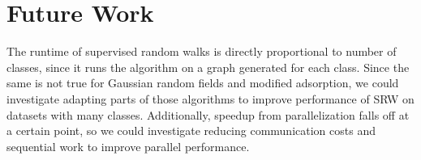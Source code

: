 \documentclass[12pt]{article}
\begin{document}
\section{Future Work}
The runtime of supervised random walks is directly proportional to number of classes, since it runs the algorithm on a graph generated for each class.
Since the same is not true for Gaussian random fields and modified adsorption, we could investigate adapting parts of those algorithms to improve performance of SRW on datasets with many classes.
Additionally, speedup from parallelization falls off at a certain point, so we could investigate reducing communication costs and sequential work to improve parallel performance.



{}
\end{document}
